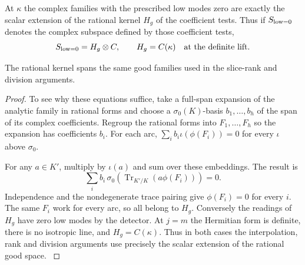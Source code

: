 \begin{proposition}
\label{prop:shifted-low-mode-descent}
At \(\kappa\) the complex families with the prescribed low modes
zero are exactly the scalar extension of the rational kernel \(H_g\)
of the coefficient tests. Thus if \(S_{\rm low=0}\) denotes the complex subspace defined by those coefficient tests,
\[
 S_{\rm low=0}=H_g\otimes\mathbb C,\qquad H_g=C(\kappa)\quad\text{at the definite lift}.
\]

The rational kernel spans the same good families used in the
slice-rank and division arguments.
\end{proposition}

\begin{proof}
To see why these equations suffice, take a full-span expansion
of the analytic family in rational forms and choose a
\(\sigma_0(K)\)-basis \(b_1,\ldots,b_h\) of the span of its complex
coefficients. Regroup the rational forms into \(F_1,\ldots,F_h\)
so the expansion has coefficients \(b_i\). For each arc,
\(\sum_i b_i\iota(\phi(F_i))=0\) for every \(\iota\) above
\(\sigma_0\).

For any \(a\in K'\), multiply by \(\iota(a)\) and
sum over these embeddings. The result is
\[
 \sum_i b_i\,\sigma_0\!\left(
       \operatorname{Tr}_{K'/K}(a\phi(F_i))\right)=0 .
\]
Independence and the nondegenerate trace pairing give
\(\phi(F_i)=0\) for every \(i\). The same \(F_i\) work for every
arc, so all belong to \(H_g\). Conversely the readings of \(H_g\)
have zero low modes by the detector. At \(j=m\) the Hermitian
form is definite, there is no isotropic line, and \(H_g=C(\kappa)\).
Thus in both cases the interpolation, rank and division arguments
use precisely the scalar extension of the rational good space.
\label{cor:slice-shifted-theta-3}

\end{proof}


